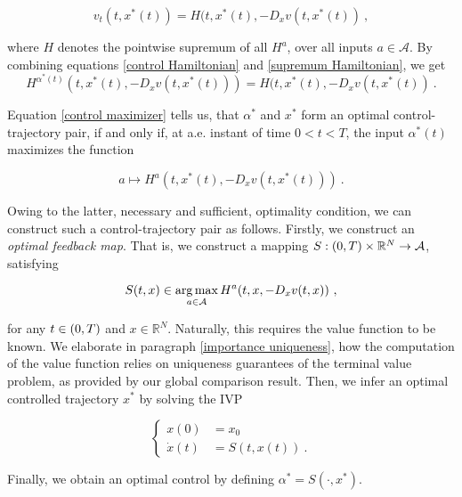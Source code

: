 \begin{equation}
	\label{supremum Hamiltonian}
	v_t(t, x^{*}(t)) = H(t, x^{*}(t), -D_x v(t, x^{*}(t)) \ ,
\end{equation}

where $ H $ denotes the pointwise supremum of all $ H^{a} $, over all inputs $ a \in \mathcal{A} $. By combining equations \eqref{control Hamiltonian} and \eqref{supremum Hamiltonian}, we get
\begin{equation}
\label{control maximizer}
	H^{\alpha^{*}(t)}(t, x^{*}(t), -D_x v(t, x^{*}(t))) = H(t, x^{*}(t), -D_x v(t, x^{*}(t)) \ .
\end{equation}

Equation \eqref{control maximizer} tells us, that $ \alpha^* $ and $ x^* $ form an optimal control-trajectory pair, if and only if, at a.e. instant of time $ 0 < t < T $, the input $ \alpha^{*}(t) $ maximizes the function

\begin{equation*}
	a \mapsto H^{a}(t, x^{*}(t), -D_x v(t, x^{*}(t))) \ .
\end{equation*}

Owing to the latter, necessary and sufficient, optimality condition, we can construct such a control-trajectory pair as follows. Firstly, we construct an \emph{optimal feedback map}. That is, we construct a mapping $ S : \left(0, T\right) \times \mathbb{R}^N \to \mathcal{A} $, satisfying

\begin{equation*}
	S(t, x) \in \operatorname*{arg\,max}_{a \in \mathcal{A}} H^{a}(t, x, -D_x v(t, x)) \ ,
\end{equation*}

for any $ t \in \left(0, T\right) $ and $ x \in \mathbb{R}^N $. Naturally, this requires the value function to be known. We elaborate in paragraph \ref{importance uniqueness}, how the computation of the value function relies on uniqueness guarantees of the terminal value problem, as provided by our global comparison result. Then, we infer an optimal controlled trajectory $ x^{*} $ by solving the IVP

\begin{equation}
\label{feedback IVP}
	\begin{cases}
	x(0) &= x_0 \\
	\dot{x}(t) &= S(t, x(t)) \ .
	\end{cases}
\end{equation}

Finally, we obtain an optimal control by defining $ \alpha^{*} = S(\cdot, x^{*}) $. 

